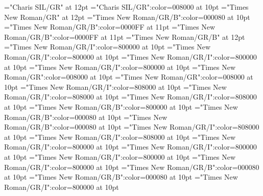 \documentclass[a4paper,twoside]{article}
\begin{document}
\pagestyle{plain}
\sloppy
\setlength{\parfillskip}{0pt plus 1fil}
\font\dives="Charis SIL/GR" at 12pt
\font\spanes="Charis SIL/GR":color=008000 at 10pt
\font\divmxb="Times New Roman/GR" at 12pt
\font\spanmxb="Times New Roman/GR/B":color=000080 at 10pt
\font\spanmxbmainheadwordentry="Times New Roman/GR/B":color=0000FF at 11pt
\font\spanmainheadwordentry="Times New Roman/GR/B":color=0000FF at 11pt
\font\sensenumbersensecontentsensesentry="Times New Roman/GR/B" at 12pt
\font\spanespartofspeechmorphosyntaxanalysissharedgrammaticalinfosensesentry="Times New Roman/GR/I":color=800000 at 10pt
\font\spanpartofspeechmorphosyntaxanalysissharedgrammaticalinfosensesentry="Times New Roman/GR/I":color=800000 at 10pt
\font\spanespartofspeechmorphosyntaxanalysissensesensecontentsensesentry="Times New Roman/GR/I":color=800000 at 10pt
\font\spanpartofspeechmorphosyntaxanalysissensesensecontentsensesentry="Times New Roman/GR/I":color=800000 at 10pt
\font\spanesdefinitionsensesensecontentsensesentry="Times New Roman/GR":color=008000 at 10pt
\font\spandefinitionsensesensecontentsensesentry="Times New Roman/GR":color=008000 at 10pt
\font\comentariorestrictivosensesensecontentsensesentry="Times New Roman/GR/I":color=808000 at 10pt
\font{}="Times New Roman/GR/I":color=808000 at 10pt
\font\scientificnamesensesensecontentsensesentry="Times New Roman/GR/I":color=808000 at 10pt
\font\sensenumbersensecontentsensessensesensecontentsensesentry="Times New Roman/GR/B":color=800000 at 10pt
\font\spanmxbexampleexamplescontentssensesensecontentsensesentry="Times New Roman/GR/B":color=000080 at 10pt
\font\spanexampleexamplescontentssensesensecontentsensesentry="Times New Roman/GR/B":color=000080 at 10pt
\font\spanesencyclopedicinfosensesensecontentsensesentry="Times New Roman/GR/I":color=808000 at 10pt
\font\spanencyclopedicinfosensesensecontentsensesentry="Times New Roman/GR/I":color=808000 at 10pt
\font\spanescommententry="Times New Roman/GR/I":color=800000 at 10pt
\font\spancommententry="Times New Roman/GR/I":color=800000 at 10pt
\font\spanesabbreviationvariantentrytypevariantentrytypesvariantformentrybackrefsentry="Times New Roman/GR/I":color=800000 at 10pt
\font\spanabbreviationvariantentrytypevariantentrytypesvariantformentrybackrefsentry="Times New Roman/GR/I":color=800000 at 10pt
\font\spanmxbheadwordvariantformentrybackrefvariantformentrybackrefsentry="Times New Roman/GR/B":color=000080 at 10pt
\font\spanheadwordvariantformentrybackrefvariantformentrybackrefsentry="Times New Roman/GR/B":color=000080 at 10pt
\font\spanesabbreviationvariantentrytypevariantentrytypesvariantformentrybackrefsbentry="Times New Roman/GR/I":color=800000 at 10pt
\end{document}
